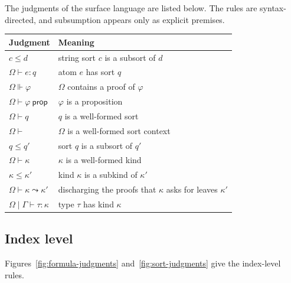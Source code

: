 \documentclass[11pt]{article}
\newcommand{\kw}[1]{\mathsf{#1}}
\newcommand{\proves}{\Vdash}
\newcommand{\isprop}{\ \kw{prop}}
\newcommand{\discharge}[3]{#1 \vdash #2 \leadsto #3}
\newcommand{\kinding}[4]{#1 \mid #2 \vdash #3 : #4}
\theoremstyle{remark}
\begin{document}
The judgments of the surface language are listed below. The rules are syntax-directed, and
subsumption appears only as explicit premises.

\begin{center}
\begin{tabular}{ll}
\toprule
Judgment & Meaning \\
\midrule
$c \leq d$ & string sort $c$ is a subsort of $d$ \\
$\Omega \vdash e : q$ & atom $e$ has sort $q$ \\
$\Omega \proves \varphi$ & $\Omega$ contains a proof of $\varphi$ \\
$\Omega \vdash \varphi \isprop$ & $\varphi$ is a proposition \\
$\Omega \vdash q$ & $q$ is a well-formed sort \\
$\Omega \vdash$ & $\Omega$ is a well-formed sort context \\
$q \leq q'$ & sort $q$ is a subsort of $q'$ \\
$\Omega \vdash \kappa$ & $\kappa$ is a well-formed kind \\
$\kappa \leq \kappa'$ & kind $\kappa$ is a subkind of $\kappa'$ \\
$\discharge{\Omega}{\kappa}{\kappa'}$ & discharging the proofs that $\kappa$ asks for leaves $\kappa'$ \\
$\kinding{\Omega}{\Gamma}{\tau}{\kappa}$ & type $\tau$ has kind $\kappa$ \\
\bottomrule
\end{tabular}
\end{center}

\subsection{Index level}

Figures~\ref{fig:formula-judgments} and~\ref{fig:sort-judgments} give the index-level rules.
\end{document}
